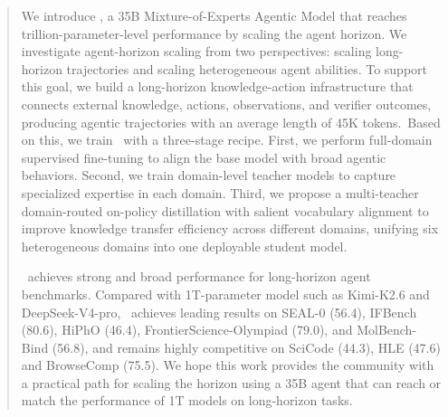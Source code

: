\begin{abstract}
\vspace{-10pt}
We introduce \ProjectName, a 35B Mixture-of-Experts Agentic Model that reaches trillion-parameter-level performance by scaling the agent horizon. We investigate agent-horizon scaling from two perspectives: scaling long-horizon trajectories and scaling heterogeneous agent abilities. To support this goal, we build a long-horizon knowledge-action infrastructure that connects external knowledge, actions, observations, and verifier outcomes, producing agentic trajectories with an average length of 45K tokens.~Based on this, we train \ProjectName~with a three-stage recipe. First, we perform full-domain supervised fine-tuning to align the base model with broad agentic behaviors. Second, we train domain-level teacher models to capture specialized expertise in each domain. Third, we propose a multi-teacher domain-routed on-policy distillation with salient vocabulary alignment to improve knowledge transfer efficiency across different domains, unifying six heterogeneous domains into one deployable student model.

\ProjectName~achieves strong and broad performance for long-horizon agent benchmarks. Compared with 1T-parameter model such as Kimi-K2.6 and DeepSeek-V4-pro, \ProjectName~achieves leading results on SEAL-0 (56.4), IFBench (80.6), HiPhO (46.4), FrontierScience-Olympiad (79.0), and MolBench-Bind (56.8), and remains highly competitive on SciCode (44.3), HLE (47.6) and BrowseComp (75.5). We hope this work provides the community with a practical path for scaling the horizon using a 35B agent that can reach or match the performance of 1T models on long-horizon tasks.
\end{abstract}
\newpage
